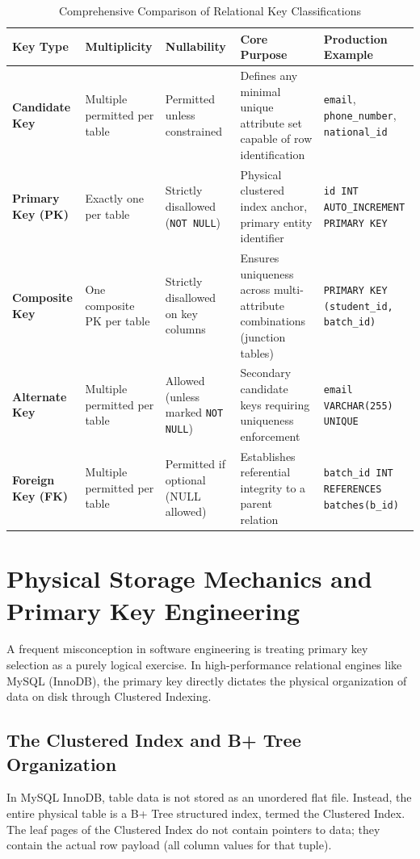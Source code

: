 \documentclass[10pt,journal,compsoc,onecolumn]{IEEEtran}
\begin{document}
\begin{table}[t]
\caption{Comprehensive Comparison of Relational Key Classifications}
\label{tab:key_taxonomy}
\centering
\begin{tabular}{p{2.8cm}p{2.2cm}p{2.8cm}p{3.8cm}p{4.0cm}}
\toprule
\textbf{Key Type} & \textbf{Multiplicity} & \textbf{Nullability} & \textbf{Core Purpose} & \textbf{Production Example} \\
\midrule
\textbf{Candidate Key} & Multiple permitted per table & Permitted unless constrained & Defines any minimal unique attribute set capable of row identification & \texttt{email}, \texttt{phone\_number}, \texttt{national\_id} \\
\midrule
\textbf{Primary Key (PK)} & Exactly one per table & Strictly disallowed (\texttt{NOT NULL}) & Physical clustered index anchor, primary entity identifier & \texttt{id INT AUTO\_INCREMENT PRIMARY KEY} \\
\midrule
\textbf{Composite Key} & One composite PK per table & Strictly disallowed on key columns & Ensures uniqueness across multi-attribute combinations (junction tables) & \texttt{PRIMARY KEY (student\_id, batch\_id)} \\
\midrule
\textbf{Alternate Key} & Multiple permitted per table & Allowed (unless marked \texttt{NOT NULL}) & Secondary candidate keys requiring uniqueness enforcement & \texttt{email VARCHAR(255) UNIQUE} \\
\midrule
\textbf{Foreign Key (FK)} & Multiple permitted per table & Permitted if optional (NULL allowed) & Establishes referential integrity to a parent relation & \texttt{batch\_id INT REFERENCES batches(b\_id)} \\
\bottomrule
\end{tabular}
\end{table}

\section{Physical Storage Mechanics and Primary Key Engineering}
\label{sec:pk_engineering}

A frequent misconception in software engineering is treating primary key selection as a purely logical exercise. In high-performance relational engines like MySQL (InnoDB), the primary key directly dictates the physical organization of data on disk through Clustered Indexing.

\subsection{The Clustered Index and B+ Tree Organization}
In MySQL InnoDB, table data is not stored as an unordered flat file. Instead, the entire physical table is a B+ Tree structured index, termed the Clustered Index. The leaf pages of the Clustered Index do not contain pointers to data; they contain the actual row payload (all column values for that tuple).
\end{document}
